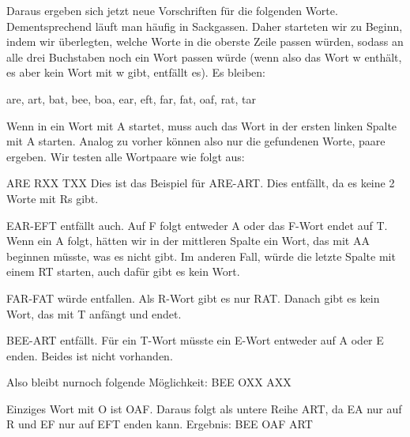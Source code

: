 \documentclass[ngerman]{fbi-aufgabenblatt}
\begin{document}
Daraus ergeben sich jetzt neue Vorschriften für die folgenden Worte. Dementsprechend läuft man häufig in Sackgassen. Daher starteten wir zu Beginn, indem wir überlegten, welche Worte in die oberste Zeile passen würden, sodass an alle drei Buchstaben noch ein Wort passen würde (wenn also das Wort w enthält, es aber kein Wort mit w gibt, entfällt es). Es bleiben:

are, art, bat, bee, boa, ear, eft, far, fat, oaf, rat, tar

Wenn in ein Wort mit A startet, muss auch das Wort in der ersten linken Spalte mit A starten. Analog zu vorher können also nur die gefundenen Worte, paare ergeben. Wir testen alle Wortpaare wie folgt aus:

ARE \newline
RXX \newline
TXX \newline
Dies ist das Beispiel für ARE-ART. Dies entfällt, da es keine 2 Worte mit Rs gibt.

EAR-EFT entfällt auch. Auf F folgt entweder A oder das F-Wort endet auf T. Wenn ein A folgt, hätten wir in der mittleren Spalte ein Wort, das mit AA beginnen müsste, was es nicht gibt. Im anderen Fall, würde die letzte Spalte mit einem RT starten, auch dafür gibt es kein Wort.

FAR-FAT würde entfallen. Als R-Wort gibt es nur RAT. Danach gibt es kein Wort, das mit T anfängt und endet.

BEE-ART entfällt. Für ein T-Wort müsste ein E-Wort entweder auf A oder E enden. Beides ist nicht vorhanden.

Also bleibt nurnoch folgende Möglichkeit: \newline
BEE \newline
OXX \newline
AXX

Einziges Wort mit O ist OAF. Daraus folgt als untere Reihe ART, da EA nur auf R und EF nur auf EFT enden kann. Ergebnis: \newline
BEE \newline
OAF \newline
ART \newline

\end{document}
